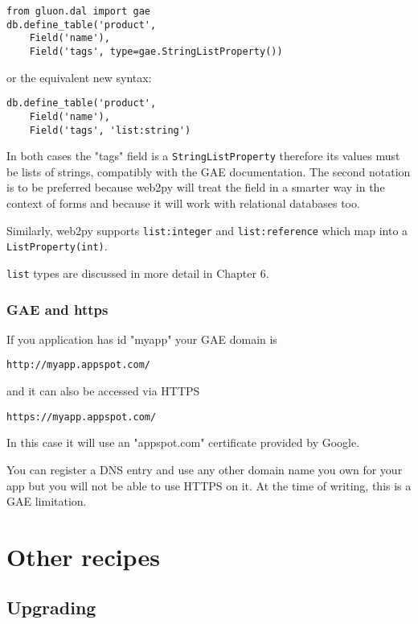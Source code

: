\documentclass[justified,sixbynine,notoc]{tufte-book}
\def\ft{\small\tt}
\begin{document}
\begin{fullwidth}
\begin{lstlisting}
from gluon.dal import gae
db.define_table('product',
    Field('name'),
    Field('tags', type=gae.StringListProperty())
\end{lstlisting}
\noindent or the equivalent new syntax:

\begin{lstlisting}
db.define_table('product',
    Field('name'),
    Field('tags', 'list:string')
\end{lstlisting}

In both cases the "tags" field is a {\ft StringListProperty} therefore its values must be lists of strings, compatibly with the GAE documentation. The second notation is to be preferred because web2py will treat the field in a smarter way in the context of forms and because it will work with relational databases too.

Similarly, web2py supports {\ft list:integer} and {\ft list:reference} which map into a {\ft ListProperty(int)}.

{\ft list} types are discussed in more detail in Chapter 6.

\goodbreak\subsection{GAE and https}

If you application has id "myapp" your GAE domain is

\begin{lstlisting}[keywords={}]
http://myapp.appspot.com/
\end{lstlisting}
\noindent and it can also be accessed via HTTPS

\begin{lstlisting}[keywords={}]
https://myapp.appspot.com/
\end{lstlisting}

In this case it will use an "appspot.com" certificate provided by Google.

You can register a DNS entry and use any other domain name you own for your app but you will not be able to use HTTPS on it. At the time of writing, this is a GAE limitation.

\goodbreak\chapter{Other recipes}

\goodbreak\section{Upgrading}


\end{fullwidth}
\end{document}
